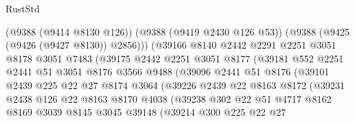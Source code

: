 \begin{lexlean}{RustStd}
\begin{coremodule}
                          (@9388 (@9414 @8130 @126))
                          (@9388 (@9419 @2430 @126 @53))
                          (@9388 (@9425 (@9426 (@9427 @8130)) @2856)))
                        (@39166
                          @8140
                          @2442
                          @2291
                          @2251
                          @3051
                          @8178
                          @3051
                          @7483
                          (@39175
                            @2442
                            @2251
                            @3051
                            @8177
                            (@39181
                              @552
                              @2251
                              @2441
                              @51
                              @3051
                              @8176
                              @3566
                              @9488
                              (@39096
                                @2441
                                @51
                                @8176
                                (@39101
                                  @2439
                                  @225
                                  @22
                                  @27
                                  @8174
                                  @3064
                                  (@39226
                                    @2439
                                    @22
                                    @8163
                                    @8172
                                    (@39231
                                      @2438
                                      @126
                                      @22
                                      @8163
                                      @8170
                                      @4038
                                      (@39238
                                        @302
                                        @22
                                        @51
                                        @4717
                                        @8162
                                        @8169
                                        @3039
                                        @8145
                                        @3045
                                        @39148
                                        (@39214
                                          @300
                                          @225
                                          @22
                                          @27

\end{coremodule}
\end{lexlean}
